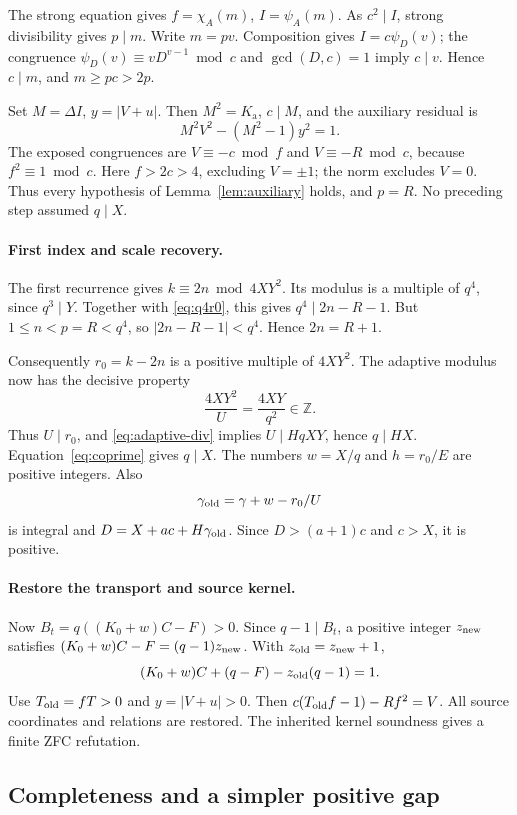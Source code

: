 \documentclass[11pt,a4paper]{article}
\theoremstyle{definition}
\newcommand{\Z}{\mathbb Z}
\newcommand{\Kaux}{K_{\mathrm a}}
\begin{document}
The strong equation gives \(f=\chi_A(m)\), \(I=\psi_A(m)\).
As \(c^2\mid I\), strong divisibility gives \(p\mid m\).
Write \(m=pv\). Composition gives \(I=c\psi_D(v)\);
the congruence \(\psi_D(v)\equiv vD^{v-1}\bmod c\)
and \(\gcd(D,c)=1\) imply \(c\mid v\).
Hence \(c\mid m\), and \(m\ge pc>2p\).

Set \(M=\Delta I\), \(y=|V+u|\). Then \(M^2=\Kaux\),
\(c\mid M\), and the auxiliary residual is
\[
 M^2V^2-(M^2-1)y^2=1.
\]
The exposed congruences are \(V\equiv-c\bmod f\) and
\(V\equiv-R\bmod c\), because \(f^2\equiv1\bmod c\).
Here \(f>2c>4\), excluding \(V=\pm1\); the norm excludes
\(V=0\). Thus every hypothesis of Lemma~\ref{lem:auxiliary}
holds, and \(p=R\). No preceding step assumed \(q\mid X\).

\paragraph{First index and scale recovery.}
The first recurrence gives \(k\equiv2n\bmod4XY^2\).
Its modulus is a multiple of \(q^4\), since \(q^3\mid Y\).
Together with \eqref{eq:q4r0}, this gives
\(q^4\mid2n-R-1\). But \(1\le n<p=R<q^4\), so
\(|2n-R-1|<q^4\). Hence \(2n=R+1\).

Consequently \(r_0=k-2n\) is a positive multiple of \(4XY^2\).
The adaptive modulus now has the decisive property
\[
 \frac{4XY^2}{U}=\frac{4XY}{q^2}\in\Z .
\]
Thus \(U\mid r_0\), and \eqref{eq:adaptive-div}
implies \(U\mid HqXY\), hence \(q\mid HX\).
Equation~\eqref{eq:coprime} gives \(q\mid X\).
The numbers \(w=X/q\) and \(h=r_0/E\) are positive integers.
Also
\[
 \gamma_{\rm old}=\gamma+w-r_0/U
\]
is integral and \(D=X+ac+H\gamma_{\rm old}\).
Since \(D>(a+1)c\) and \(c>X\), it is positive.

\paragraph{Restore the transport and source kernel.}
Now \(B_t=q((K_0+w)C-F)>0\).
Since \(q-1\mid B_t\), a positive integer \(z_{\rm new}\)
satisfies \((K_0+w)C-F=(q-1)z_{\rm new}\).
With \(z_{\rm old}=z_{\rm new}+1\),
\[
 (K_0+w)C+(q-F)-z_{\rm old}(q-1)=1.
\]
Use \(T_{\rm old}=fT>0\) and \(y=|V+u|>0\).
Then \(c(T_{\rm old}f-1)-Rf^2=V\).
All source coordinates and relations are restored.
The inherited kernel soundness gives a finite ZFC refutation.

\subsection{Completeness and a simpler positive gap}
\end{document}
